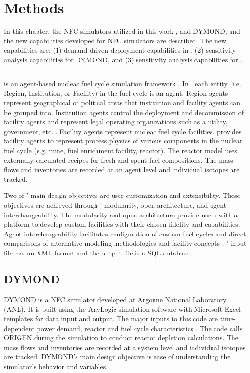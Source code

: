 \chapter{Methods}
\label{chap:3}
In this chapter, the \gls{NFC} simulators utilized in this work
, \Cyclus and DYMOND, and the new capabilities developed for 
\gls{NFC} simulators are described. 
The new capabilities are: 
(1) demand-driven deployment capabilities in \Cyclus, 
(2) sensitivity analysis capabilities for DYMOND, and
(3) sensitivity analysis capabilities for \Cyclus. 

\section{\Cyclus}
\Cyclus is an agent-based nuclear fuel cycle simulation framework 
\cite{huff_fundamental_2016}. 
In \Cyclus, each entity (i.e. Region, Institution, or Facility) in 
the fuel cycle is an agent. 
Region agents represent geographical or political areas that institution
and facility agents can be grouped into. 
Institution agents control the 
deployment and decommission of facility agents 
and represent legal operating organizations such as a 
utility, government, etc. \cite{huff_fundamental_2016}. 
Facility agents represent nuclear fuel cycle facilities. 
\Cycamore \cite{carlsen_cycamore_2014}
provides facility agents to represent process physics of various 
components in the nuclear fuel cycle (e.g. mine, fuel enrichment 
facility, reactor). 
The \Cycamore reactor model uses externally-calculated 
recipes for fresh and spent fuel compositions. 
The mass flows and inventories are recorded at an agent level
and individual isotopes are tracked. 

Two of \Cyclus' main design objectives are user customization and 
extensibility. 
These objectives are achieved through \Cyclus' modularity, 
open architecture, and agent interchangeability. 
The modularity and open architecture provide users with a 
platform to develop custom facilities with their chosen fidelity 
and capabilities. 
Agent interchangeability facilitates configuration of custom fuel 
cycles and direct comparisons of alternative modeling methodologies 
and facility concepts \cite{huff_fundamental_2016}. 
\Cyclus' input file has an XML format and the output file is 
a SQL database. 

\section{DYMOND}
DYMOND \cite{yacout_modeling_2005} is a \gls{NFC} simulator developed 
at Argonne National Laboratory (\gls{ANL}). 
It is built using the AnyLogic simulation software with 
Microsoft Excel templates for data input and output. 
The major inputs to this code are time-dependent power demand, 
reactor and fuel cycle characteristics 
\cite{feng_standardized_2016}.   
The code calls ORIGEN \cite{bell_origen_1973} during the simulation 
to conduct reactor depletion calculations. 
The mass flows and inventories are recorded at a system level
and individual isotopes are tracked. 
DYMOND's main design objective is ease of understanding the  
simulator's behavior and variables. 

